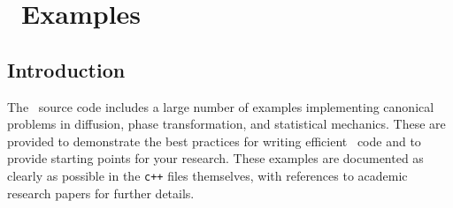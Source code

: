 
\chapter{\MMSP\ Examples}

\section{Introduction}
	The \MMSP\ source code includes a large number of examples implementing
	canonical problems in diffusion, phase transformation, and statistical
	mechanics. These are provided to demonstrate the best practices for
	writing efficient \MMSP\ code and to provide starting points for your
	research. These examples are documented as clearly as possible in the
	{\tt c++} files themselves, with references to academic research papers
	for further details. 

